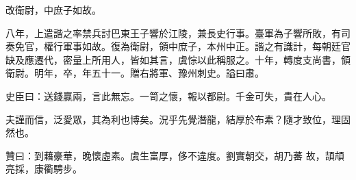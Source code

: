 \begin{pinyinscope}
 改衛尉，中庶子如故。



 八年，上遣諧之率禁兵討巴東王子響於江陵，兼長史行事。臺軍為子響所敗，有司奏免官，權行軍事如故。復為衛尉，領中庶子，本州中正。諧之有識計，每朝廷官缺及應遷代，密量上所用人，皆如其言，虞悰以此稱服之。十年，轉度支尚書，領衛尉。明年，卒，年五十一。贈右將軍、豫州刺史。謚曰肅。



 史臣曰：送錢贏兩，言此無忘。一笥之懷，報以都尉。千金可失，貴在人心。



 夫謹而信，泛愛眾，其為利也博矣。況乎先覺潛龍，結厚於布素？隨才致位，理固然也。



 贊曰：到藉豪華，晚懷虛素。虞生富厚，侈不違度。劉實朝交，胡乃蕃
 故，頡頏亮採，康衢騁步。



\end{pinyinscope}